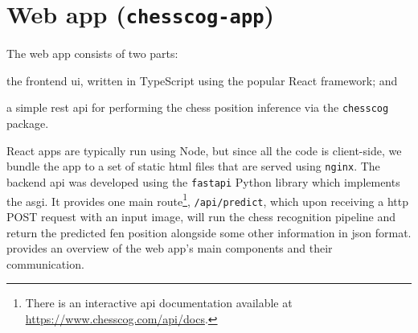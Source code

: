 \documentclass[../main.tex]{subfiles}
\begin{document}
\section{Web app (\texttt{chesscog-app})}
\label{sec:implementation_chesscogapp}
The web app consists of two parts:
\begin{enumerate*}[label=(\roman*)]
    \item the frontend \gls{ui}, written in TypeScript using the popular React framework; and
    \item a simple \gls{rest} \gls{api} for performing the chess position inference via the \texttt{chesscog} package.
\end{enumerate*}
React apps are typically run using Node, but since all the code is client-side, we bundle the app to a set of static \gls{html} files that are served using \texttt{nginx}.
The backend \gls{api} was developed using the \texttt{fastapi} Python library which implements the \gls{asgi}.
It provides one main route\footnote{There is an interactive \gls{api} documentation available at \url{https://www.chesscog.com/api/docs}.}, \texttt{/api/predict}, which upon receiving a \gls{http} POST request with an input image, will run the chess recognition pipeline and return the predicted \gls{fen} position alongside some other information in \gls{json} format.
 provides an overview of the web app's main components and their communication.
\end{document}
